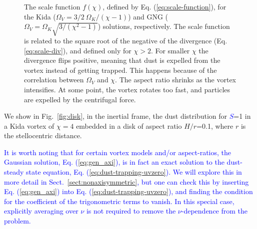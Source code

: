 \documentclass[apj]{emulateapj}
\def\blue#1{\textcolor{blue}{ #1}}
\newcommand{\Eq}[1]{Eq. (\ref{#1})}
\newcommand{\eq}[1]{\Eq{#1}}
\newcommand{\eqp}[1]{(Eq. \ref{#1})}
\newcommand{\Fig}[1]{Fig.~\ref{#1}}
\newcommand{\fig}[1]{\Fig{#1}}
\newcommand{\sect}[1]{Sect.~\ref{#1}}
\begin{document}
\begin{figure}
  \begin{center}
  \end{center}
\caption[]{The scale function $f(\chi)$, defined by
  \eq{eq:scale-function}, for the Kida ($\varOmega_V=3/2
  \ \varOmega_K/(\chi-1)$) and GNG ($\varOmega_V=\varOmega_K
  \sqrt{3/(\chi^2-1)}$) solutions, respectively. The scale function is
  related to the square root of the negative of the divergence
  \eqp{eq:scale-div}, and defined only for $\chi>2$. For smaller $\chi$ the
  divergence flips positive, meaning that dust is expelled from the
  vortex instead of getting trapped. This happens because of the
  correlation between $\varOmega_V$ and $\chi$. The aspect ratio shrinks
  as the vortex intensifies. At some point, the vortex rotates too
  fast, and particles are expelled by the centrifugal force.}
 \label{fig:scale-function}
\end{figure}

We show in \fig{fig:disk}, in the inertial frame, 
the dust distribution for \blue{$S$}=1 in a Kida vortex of $\chi=4$ embedded in a 
disk of aspect ratio $H/r$=0.1, where $r$ is the stellocentric
distance. 

\blue{It is worth noting that for certain vortex models and/or
aspect-ratios, the Gaussian solution, \eq{eq:gen_axi}, is in fact an 
exact solution to the dust-steady state equation, \eq{eq:dust-trapping-uvzero}.  
We will explore this in more detail  in \sect{sect:nonaxisymmetric}, but one can check this by inserting
\eq{eq:gen_axi} into \eq{eq:dust-trapping-uvzero}, and finding the condition 
for the coefficient of the trigonometric terms to vanish. 
In this special case, explicitly averaging over $\nu$ is not
required to remove the $\nu$-dependence from the 
problem.} 
\end{document}

